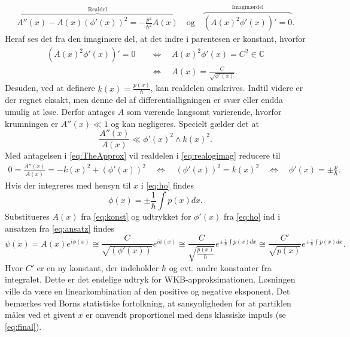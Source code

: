 \begin{align}
    \overbrace{A''(x) - A(x)\left( \phi'(x) \right)^{2} = - \frac{p^{2}}{\hbar^{2}}A(x)}^{\text{Realdel}} \quad \text{og} \quad%
    \overbrace{\left( A(x)^{2}\phi'(x) \right)' = 0}^{\text{Imaginærdel}}.
    \label{eq:realogimag}
\end{align}
Heraf ses det fra den imaginære del, at det indre i parentesen er konstant, hvorfor
\begin{align}
    \left( A(x)^{2}\phi'(x) \right)' = 0  \quad & \Leftrightarrow  \quad A(x)^{2}\phi'(x) = C^{2} \in \mathbb{C} \\
    & \Leftrightarrow  \quad A(x) = \frac{C}{\sqrt{\phi'(x)}}.
    \label{eq:konst}
\end{align}
Desuden, ved at definere $k(x) = \frac{p(x)}{\hbar}$, kan realdelen omskrives. Indtil videre er der regnet eksakt, men denne del af differentialligningen er svær eller endda umulig at løse. Derfor antages $A$ som værende langsomt varierende, hvorfor krumningen er $A''(x)\ll 1$ og kan  negligeres.
Specielt gælder det at
\begin{equation}
  \frac{A''(x)}{A(x)} \ll \phi'(x)^{2}\wedge k(x)^2.
  \label{eq:TheApprox}
\end{equation}
Med antagelsen i \cref{eq:TheApprox} vil realdelen i \cref{eq:realogimag} reducere til
\begin{align}
    0 = \frac{A''(x)}{A(x)} = -k(x)^{2} + (\phi'(x))^{2}
    \quad \Leftrightarrow\quad  \left(\phi'(x)\right)^{2} = k(x)^{2} \quad \Leftrightarrow \quad  \phi'(x) = \pm \frac{p}{\hbar}.
    \label{eq:ho}
\end{align}
Hvis der integreres med hensyn til $x$ i \cref{eq:ho} findes
%
\begin{equation}
    \phi(x) = \pm \frac{1}{\hbar} \int p(x) dx.
    \label{eq:thisPhi}
\end{equation}
%
Substitueres $A(x)$ fra \cref{eq:konst} og udtrykket for $\phi{'\left (x \right )}$ fra \cref{eq:ho}  ind i ansatzen fra \cref{eq:ansatz} findes
\begin{equation}
    \psi(x) = A(x) e^{i \phi(x)} \cong
    \frac{C}{\sqrt{( \phi{'\left (x \right )})}} e^{i \phi(x)} \cong
    \frac{C}{\sqrt{\frac{p(x)}{\hbar}}} e^{\pm \frac{i}{\hbar} \int p(x) dx} \cong
    \frac{C'}{\sqrt{p(x)}} e^{\pm \frac{i}{\hbar} \int p(x) dx}.
    \label{eq:final}
\end{equation}
%
Hvor $C'$ er en ny konstant, der indeholder $\hbar$ og evt. andre konstanter fra integralet. Dette er det endelige udtryk for WKB-approksimationen. Løsningen ville da være en linearkombination af den positive og negative eksponent. Det bemærkes ved Borns statistiske fortolkning, at sansynligheden for at partiklen måles ved et givent $x$ er omvendt proportionel med dens klassiske impuls (se \cref{eq:final}).
